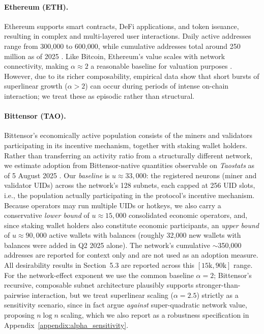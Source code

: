 \documentclass[12pt]{article}
\begin{document}
\paragraph{Ethereum (ETH).}
Ethereum supports smart contracts, DeFi applications, and token issuance, resulting in complex and multi-layered user interactions. Daily active addresses range from 300{,}000 to 600{,}000, while cumulative addresses total around 250 million as of 2025 \citep{glassnodeETH,etherscan}. Like Bitcoin, Ethereum’s value scales with network connectivity, making \( \alpha \approx 2 \) a reasonable baseline for valuation purposes \citep{lee2020measurements}. However, due to its richer composability, empirical data show that short bursts of superlinear growth (\( \alpha > 2 \)) can occur during periods of intense on-chain interaction; we treat these as episodic rather than structural.

\paragraph{Bittensor (TAO).}
Bittensor’s economically active population consists of the miners and validators participating in its incentive mechanism, together with staking wallet holders. Rather than transferring an activity ratio from a structurally different network, we estimate adoption from Bittensor-native quantities observable on \textit{Taostats} as of 5 August 2025 \citep{taostats_accounts}. Our \emph{baseline} is \( u \approx 33{,}000 \): the registered neurons (miner and validator UIDs) across the network's 128 subnets, each capped at 256 UID slots, i.e., the population actually participating in the protocol's incentive mechanism. Because operators may run multiple UIDs or hotkeys, we also carry a conservative \emph{lower bound} of \( u \approx 15{,}000 \) consolidated economic operators, and, since staking wallet holders also constitute economic participants, an \emph{upper bound} of \( u \approx 90{,}000 \) active wallets with balances (roughly 32{,}000 new wallets with balances were added in Q2 2025 alone). The network's cumulative \( \sim \)350{,}000 addresses are reported for context only and are not used as an adoption measure. All desirability results in Section~5.3 are reported across this \([15\text{k}, 90\text{k}]\) range. For the network-effect exponent we use the common baseline \( \alpha = 2 \); Bittensor's recursive, composable subnet architecture plausibly supports stronger-than-pairwise interaction, but we treat superlinear scaling (\( \alpha = 2.5 \)) strictly as a sensitivity scenario, since \citet{briscoe2006metcalfe} in fact argue \emph{against} super-quadratic network value, proposing \( n \log n \) scaling, which we also report as a robustness specification in Appendix~\ref{appendix:alpha_sensitivity}.
\end{document}
